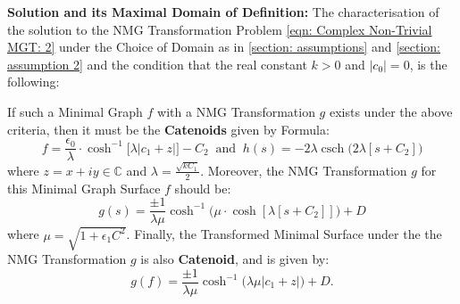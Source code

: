 \documentclass[12pt]{article}
\theoremstyle{plain}
\theoremstyle{definition}
\theoremstyle{remark}
\begin{document}
\textbf{Solution and its Maximal Domain of Definition:} 
The characterisation of the solution to the NMG Transformation Problem \ref{eqn: Complex Non-Trivial MGT: 2} under the Choice of Domain as in \ref{section: assumptions} and \ref{section: assumption 2} and the condition that the real constant $k>0$ and \(|c_0|=0\), is the following:

If such a Minimal Graph $f$ with a NMG Transformation $g$ exists under the above criteria, then it must be the \textbf{Catenoids} given by Formula:
\[
\boxed{f=\frac{\epsilon_0}{\lambda}\cdot \cosh^{-1}\Big[\lambda|c_1 +  z|\Big]-C_2} \;\;\text{and}\;\;\boxed{h(s)=-2\lambda\operatorname{csch}\big(2\lambda[s+C_2]\big)}
\]
where \(z=x+iy\in\mathbb{C}\) and $\lambda=\tfrac{\sqrt{kC_1}}{2}$. Moreover, the NMG Transformation $g$ for this Minimal Graph Surface \(f\) should be:
\[
\boxed{g(s)=\frac{\pm1}{\lambda\mu}\cosh^{-1}\big(\mu\cdot\cosh[\lambda[s+C_2]]\big)+D}
\]
where $\mu=\sqrt{1 +\epsilon_1 C^2}$. Finally, the Transformed Minimal Surface under the the NMG Transformation $g$  is also \textbf{Catenoid}, and is given by: 
\[
\boxed{g(f) = \frac{\pm1}{\lambda\mu}\cosh^{-1}\big(\lambda\mu|c_1 +  z|\big)+D.}
\]
\end{document}
